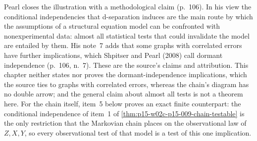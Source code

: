 Pearl closes the illustration with a methodological claim
(p.~106). In his view the conditional independencies that d-separation
induces are the main route by which the assumptions of a structural
equation model can be confronted with nonexperimental data: almost all
statistical tests that could invalidate the model are entailed by them.
His note~7 adds that some graphs with correlated errors have further
implications, which Shpitser and Pearl (2008) call dormant independence
(p.~106, n.~7). These are the source's claims and attribution. This
chapter neither states nor proves the dormant-independence implications,
which the source ties to graphs with correlated errors, whereas the
chain's diagram has no double arrow; and the general claim about almost
all tests is not a theorem here. For the
chain itself, item~5 below proves an exact finite counterpart: the
conditional independence of item~1 of
\cref{thm:p15-w02c-p15-009-chain-testable} is the only restriction that
the Markovian chain places on the observational law of \(Z,X,Y\), so
every observational test of that model is a test of this one implication.


